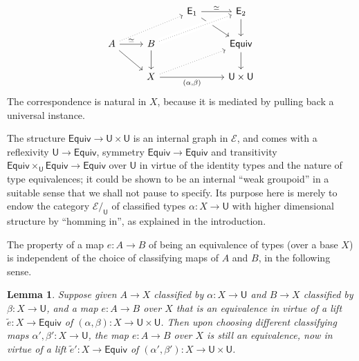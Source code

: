 \documentclass[12pt,reqno]{amsart}
\newcommand{\EE}{\ensuremath{\mathcal{E}}}
\renewcommand{\to}{\ensuremath{\rightarrow}}
\newcommand{\T}{\ensuremath{\mathsf{U}}}
\newtheorem{lemma}[theorem]{Lemma}
\theoremstyle{remark}
\theoremstyle{definition}
\begin{document}
\begin{equation}\label{diag:univalence3}
\begin{tikzcd} 
	&& \mathsf{E}_1 \ar[rd]  \ar[r,"{\simeq}"]  & \mathsf{E}_2 \ar[d] \\  
A \ar[rd] \ar[r, "{\simeq}"] \ar[rru, dotted] & B \ar[d] \ar[rru, crossing over, dotted] && \mathsf{Equiv} \ar[d] \\  
& X \ar[rru, dotted] \ar[rr, swap, "{(\alpha, \beta)}"] && \T \times \T
	 \end{tikzcd}
 \end{equation}
The correspondence is natural in $X$, because it is mediated by pulling back a universal instance.  

The structure $\mathsf{Equiv} \to \T \times \T$ is an internal graph in $\EE$, and comes with a reflexivity $\T \to \mathsf{Equiv}$, symmetry $\mathsf{Equiv} \to \mathsf{Equiv}$ and transitivity $\mathsf{Equiv}\times_\T \mathsf{Equiv} \to \mathsf{Equiv}$ over $\T$ in virtue of the identity types and the nature of type equivalences; it could be shown to be an internal ``weak groupoid'' in a suitable sense that we shall not pause to specify.  Its purpose here is merely to endow the category $\EE/_\T$ of classified types $\alpha : X \to \T$ with higher dimensional structure by ``homming in'', as explained in the introduction. 

The property of a map $e : A \to B$ of being an equivalence of types (over a base $X$) is independent of the choice of classifying maps of $A$ and $B$, in the following sense.
\begin{lemma}\label{lemma:equivinvariance}
Suppose given $A\to X$ classified by $\alpha: X \to \T$ and $B \to X$ classified by $\beta: X \to \T$, and a map $e : A \to B$ over $X$ that is an equivalence in virtue of a lift $\tilde{e} : X \to  \mathsf{Equiv}$ of $(\alpha, \beta) : X \to \T\times \T$.   Then upon choosing different classifying maps $\alpha', \beta' : X \to \T$, the map $e : A \to B$ over $X$ is still an equivalence, now in virtue of a lift ${\tilde{e}}' : X \to \mathsf{Equiv}$ of $(\alpha', \beta') : X \to \T\times \T$.
\end{lemma}
\end{document}
